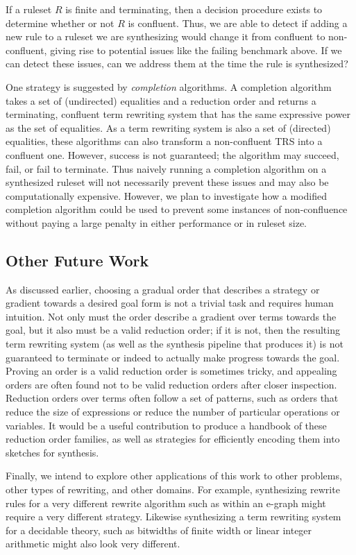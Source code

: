 If a ruleset $R$ is finite and terminating, then a decision procedure exists to determine whether or not $R$ is confluent. Thus, we are able to detect if adding a new rule to a ruleset we are synthesizing would change it from confluent to non-confluent, giving rise to potential issues like the failing benchmark above. If we can detect these issues, can we address them at the time the rule is synthesized?

One strategy is suggested by \emph{completion} algorithms. A completion algorithm takes a set of (undirected) equalities and a reduction order and returns a terminating, confluent term rewriting system that has the same expressive power as the set of equalities. As a term rewriting system is also a set of (directed) equalities, these algorithms can also transform a non-confluent TRS into a confluent one. However, success is not guaranteed; the algorithm may succeed, fail, or fail to terminate. Thus naively running a completion algorithm on a synthesized ruleset will not necessarily prevent these issues and may also be computationally expensive. However, we plan to investigate how a modified completion algorithm could be used to prevent some instances of non-confluence without paying a large penalty in either performance or in ruleset size.

\subsection{Other Future Work}

As discussed earlier, choosing a gradual order that describes a strategy or gradient towards a desired goal form is not a trivial task and requires human intuition. Not only must the order describe a gradient over terms towards the goal, but it also must be a valid reduction order; if it is not, then the resulting term rewriting system (as well as the synthesis pipeline that produces it) is not guaranteed to terminate or indeed to actually make progress towards the goal. Proving an order is a valid reduction order is sometimes tricky, and appealing orders are often found not to be valid reduction orders after closer inspection. Reduction orders over terms often follow a set of patterns, such as orders that reduce the size of expressions or reduce the number of particular operations or variables. It would be a useful contribution to produce a handbook of these reduction order families, as well as strategies for efficiently encoding them into sketches for synthesis.

Finally, we intend to explore other applications of this work to other problems, other types of rewriting, and other domains. For example, synthesizing rewrite rules for a very different rewrite algorithm such as within an e-graph might require a very different strategy. Likewise synthesizing a term rewriting system for a decidable theory, such as bitwidths of finite width or linear integer arithmetic might also look very different.

